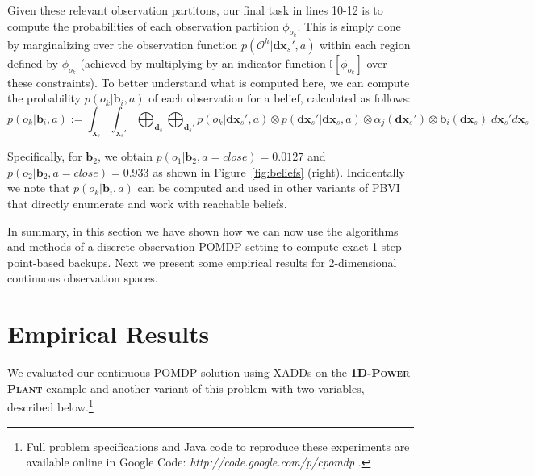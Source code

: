 \documentclass{article} %
\renewcommand{\vec}[1]{\mathbf{#1}} %
\newcommand{\xds}{\mathbf{dx}_s}
\newcommand{\xdsp}{\mathbf{dx}_s'}
\newcommand{\close}{\mathit{close}}
\begin{document}
Given these relevant observation partitons, our final task in lines
10-12 is to compute the probabilities of each observation partition
$\phi_{o_k}$.  This is simply done by marginalizing over the
observation function $p(\mathcal{O}^h|\xdsp,a)$ within each region
defined by $\phi_{o_k}$ (achieved by multiplying by an indicator
function $\mathbb{I}[\phi_{o_k}]$ over these constraints).  To better understand 
what is computed here, we can compute
the probability $p(o_k|\vec{b}_i,a)$ of each observation for a belief,
calculated as follows:
{\footnotesize
\vspace{-1mm}
\begin{equation}
p(o_k|\vec{b}_i,a) := \int_{\vec{x}_{s}} \int_{\vec{x}_s'} \bigoplus_{\vec{d}_s} \bigoplus_{\vec{d}_s'} p(o_k|\xdsp,a) \otimes p(\xdsp| \xds,a) \otimes \alpha_j(\xdsp) \otimes \vec{b}_i(\xds)\; d\vec{x}_s' d\vec{x}_s
\end{equation}
\vspace{-4mm}
}

Specifically, for $\vec{b}_2$, 
we obtain $p(o_1|\vec{b}_2,a=\close) = 0.0127$ and $p(o_2|\vec{b}_2,a=\close) = 0.933$
as shown in Figure~\ref{fig:beliefs} (right).  Incidentally we note that
$p(o_k|\vec{b}_i,a)$ can be computed and used in other variants of PBVI
that directly enumerate and work with reachable beliefs.

In summary, in this section we have shown how we can now use the algorithms and methods of a discrete observation POMDP setting to compute exact 1-step point-based backups.
Next we present some empirical results for 2-dimensional continuous observation spaces.


\section{Empirical Results}
We evaluated our continuous POMDP solution using XADDs on the
\textsc{\bf 1D-Power Plant} example and another variant of this
problem with two variables, described below.\footnote{ Full problem
specifications and Java code to reproduce these experiments are available online in
Google Code: \textit{http://code.google.com/p/cpomdp} .}
\end{document}
